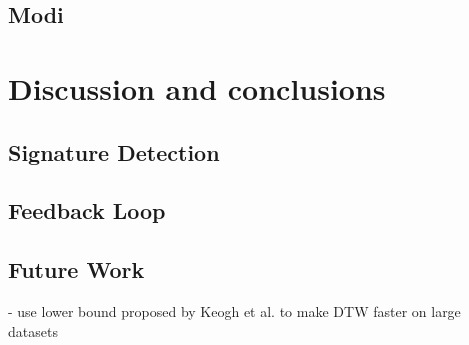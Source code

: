 \documentclass[a4paper, oneside]{csthesis}
\begin{document}


\subsection{Modi}






\section{Discussion and conclusions}

\subsection{Signature Detection}

\subsection{Feedback Loop}

\subsection{Future Work}

- use lower bound proposed by Keogh et al.\cite{Keogh:2002:EID:1287369.1287405} to make DTW faster on large datasets













\end{document}
